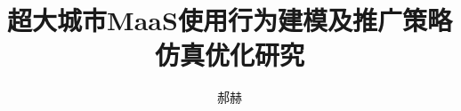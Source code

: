 \documentclass[Doctor,UTF-8]{BJTU-thesis}            %
\author{郝赫}                                  %
\title{超大城市MaaS使用行为建模及推广策略仿真优化研究}
\theoremstyle{mythm} %
\begin{document}
\raggedbottom
	\makecover                                                  %
	\twosideEmptyPage                                           %
	\makeInfo                                                   %


	\tableofcontents                                            %
	\listoffigures                                              %
    \listoftables                                               %
    	\newpage{}                              %



	
	
	\backmatter %
	\begin{appendix}
	\end{appendix}
\end{document}
